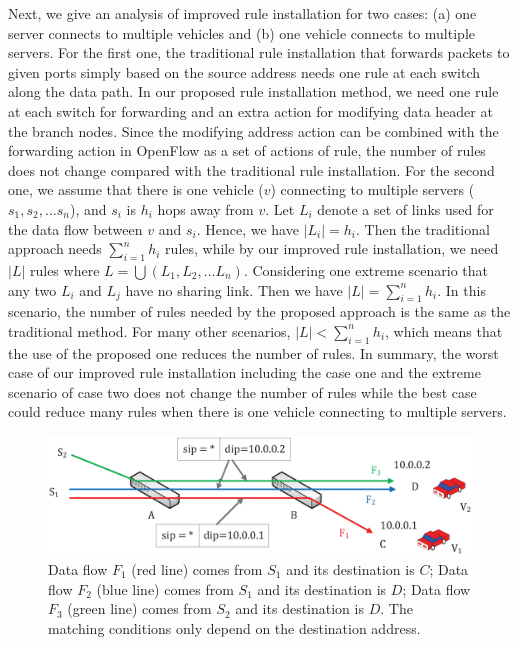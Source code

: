 \documentclass[journal]{IEEEtran}
\begin{document}
Next, we give an analysis of improved rule installation for two cases: (a) one server connects to multiple vehicles and (b) one vehicle connects to multiple servers. For the first one, the traditional rule installation that forwards packets to given ports simply based on the source address needs one rule at each switch along the data path. In our proposed rule installation method, we need one rule at each switch for forwarding and an extra action for modifying data header at the branch nodes. Since the modifying address action can be combined with the forwarding action in OpenFlow as a set of actions of rule, the number of rules does not change compared with the traditional rule installation. For the second one, we assume that there is one vehicle ($v$) connecting to multiple servers ($s_1, s_2,...s_n$), and $s_i$ is $h_i$ hops away from $v$. Let $L_i$ denote a set of links used for the data flow between $v$ and $s_i$. Hence, we have $|L_i| = h_i$. Then the traditional approach needs $\sum_{i=1}^{n} h_i$ rules, while by our improved rule installation, we need $|L|$ rules where $L = \bigcup{(L_{1}, L_{2}, ... L_{n})}$. Considering one extreme scenario that any two $L_i$ and $L_j$ have no sharing link. Then we have $|L| = \sum_{i=1}^{n} h_i$. In this scenario, the number of rules needed by the proposed approach is the same as the traditional method. For many other scenarios, $|L| < \sum_{i=1}^{n} h_i$, which means that the use of the proposed one reduces the number of rules. In summary, the worst case of our improved rule installation including the case one and the extreme scenario of case two does not change the number of rules while the best case could reduce many rules when there is one vehicle connecting to multiple servers.




\begin{figure} [t]
\begin{center}
\includegraphics[width=1\columnwidth]{fig-6-31.eps}
\caption{Data flow $F_{1}$ (red line) comes from $S_{1}$ and its destination is $C$; Data flow $F_{2}$ (blue line) comes from $S_{1}$ and its destination is $D$; Data flow $F_{3}$ (green line) comes from $S_{2}$ and its destination is $D$. The matching conditions only depend on the destination address.} \label{fig6}
\end{center}
\vspace{-0.3in}
\end{figure}
\end{document}
